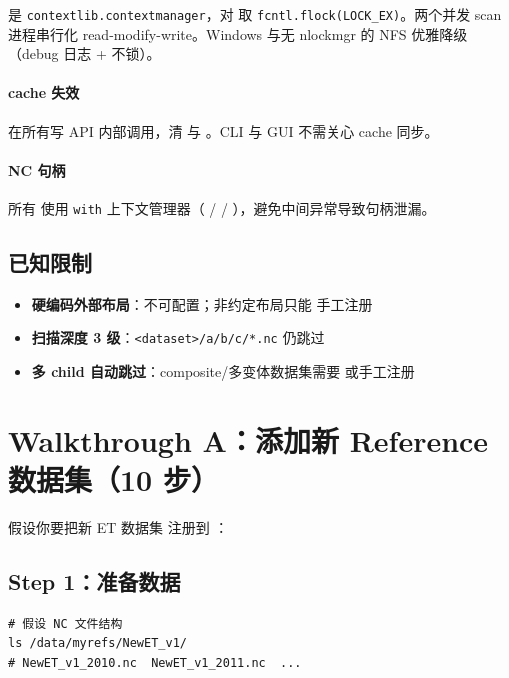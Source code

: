  是 \texttt{contextlib.contextmanager}，对  取 \texttt{fcntl.flock(LOCK\_EX)}。两个并发 scan 进程串行化 read-modify-write。Windows 与无 nlockmgr 的 NFS 优雅降级（debug 日志 + 不锁）。

\paragraph{cache 失效}

 在所有写 API 内部调用，清  与 。CLI 与 GUI 不需关心 cache 同步。

\paragraph{NC 句柄}

所有  使用 \texttt{with} 上下文管理器（ /  / ），避免中间异常导致句柄泄漏。

\subsection{已知限制}

\begin{itemize}
  \item \textbf{硬编码外部布局}：不可配置；非约定布局只能  手工注册
  \item \textbf{扫描深度 3 级}：\texttt{<dataset>/a/b/c/*.nc} 仍跳过
  \item \textbf{多 child 自动跳过}：composite/多变体数据集需要  或手工注册
\end{itemize}


\section{Walkthrough A：添加新 Reference 数据集（10 步）}

假设你要把新 ET 数据集  注册到 \openbench{}：

\subsection{Step 1：准备数据}

\begin{verbatim}
# 假设 NC 文件结构
ls /data/myrefs/NewET_v1/
# NewET_v1_2010.nc  NewET_v1_2011.nc  ...
\end{verbatim}

